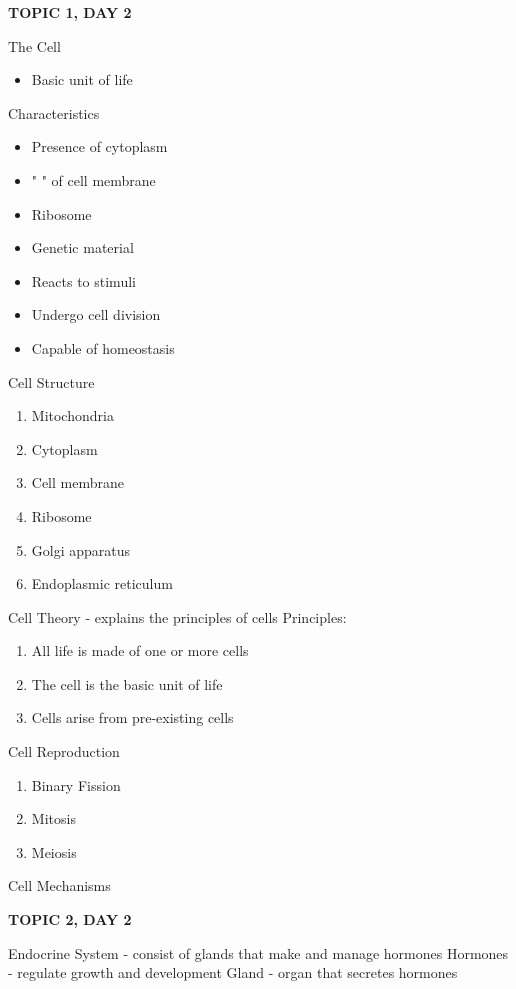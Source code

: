 {{\textbf{TOPIC 1, DAY 2}


The Cell
\begin{itemize}
    \item Basic unit of life
\end{itemize}




Characteristics
\begin{itemize}
    \item Presence of cytoplasm
    \item "              " of cell membrane
    \item Ribosome
    \item Genetic material
    \item Reacts to stimuli
    \item Undergo cell division
    \item Capable of homeostasis
\end{itemize}


Cell Structure
\begin{enumerate}
    \item Mitochondria
    \item Cytoplasm
    \item Cell membrane
    \item Ribosome
    \item Golgi apparatus
    \item Endoplasmic reticulum
\end{enumerate}


Cell Theory - explains the principles of cells
Principles: 
\begin{enumerate}
    \item All life is made of one or more cells
    \item The cell is the basic unit of life
    \item Cells arise from pre-existing cells
\end{enumerate}


Cell Reproduction
\begin{enumerate}
    \item Binary Fission
    \item Mitosis
    \item Meiosis
\end{enumerate}


Cell Mechanisms

\textbf{TOPIC 2, DAY 2}


Endocrine System - consist of glands that make and manage hormones
Hormones - regulate growth and development
Gland - organ that secretes hormones


}}
